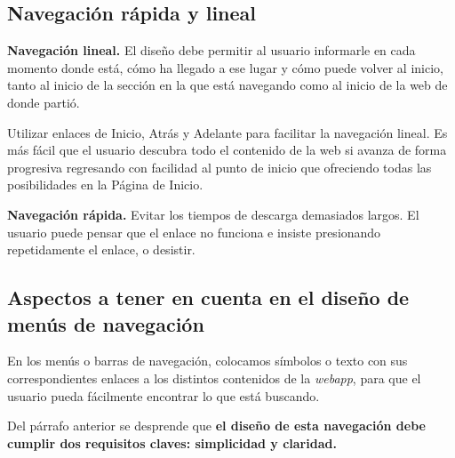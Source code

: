 	
		
	\subsection{Navegación rápida y lineal} %
	\label{sub:nav_navegacion_rapida_y_lineal}
	
		\textbf{Navegación lineal.} El diseño debe permitir al usuario informarle en cada momento donde está, cómo ha llegado a ese lugar y cómo puede volver al inicio, tanto al inicio de la sección en la que está navegando como al inicio de la web de donde partió. 

		Utilizar enlaces de Inicio, Atrás y Adelante para facilitar la navegación lineal. Es más fácil que el usuario descubra todo el contenido de la web si avanza de forma progresiva regresando con facilidad al punto de inicio que ofreciendo todas las posibilidades en la Página de Inicio.
		
		\textbf{Navegación rápida.} Evitar los tiempos de descarga demasiados largos. El usuario puede pensar que el enlace no funciona e insiste presionando repetidamente el enlace, o desistir. 
	
	\subsection{Aspectos a tener en cuenta en el diseño de menús de navegación} %
	\label{sub:nav_diseno_de_menu_de_navegacion}
	
		En los menús o barras de navegación, colocamos símbolos o texto con sus correspondientes enlaces a los distintos contenidos de la \textit{webapp}, para que el usuario pueda fácilmente encontrar lo que está buscando.
		
		Del párrafo anterior se desprende que \textbf{el diseño de esta navegación debe cumplir dos requisitos claves: simplicidad y claridad.}
		 
